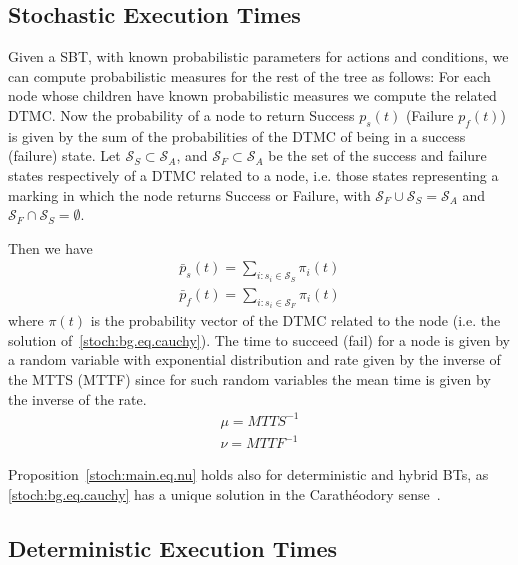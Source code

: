 
\subsection{Stochastic Execution Times}

\begin{proposition}
Given a SBT, with known probabilistic parameters for actions and conditions, we can compute probabilistic measures for the rest of the tree as follows:
For each node whose children have known probabilistic measures we compute the related DTMC. Now the probability of a node to return Success $p_s(t)$ (Failure $p_f(t)$) is given by the sum of the probabilities of the DTMC of being in a success (failure) state.
Let $\mathcal{S}_S\subset \mathcal{S}_A$, and $\mathcal{S}_F\subset \mathcal{S}_A$ be the set of the success and failure states respectively of a DTMC related to a node, i.e. those states representing a marking in which the node returns Success or Failure, with $\mathcal{S}_F \cup \mathcal{S}_S =\mathcal{S}_A$ and $\mathcal{S}_F \cap \mathcal{S}_S =\emptyset$. 

Then we have
\begin{eqnarray}
\bar p_s(t)=\displaystyle \sum_{i:s_i\in \mathcal{S}_S} \pi_i(t) \label{stoch:main.eq.ps} \\
\bar p_f(t)=\displaystyle \sum_{i:s_i\in \mathcal{S}_F} \pi_i(t)
\end{eqnarray}
where $\pi(t)$ is the probability vector of the DTMC related to the node (i.e. the solution of~\eqref{stoch:bg.eq.cauchy}). 
The time to succeed (fail) for a node is given by a random variable with exponential distribution 
and rate given by the inverse of the MTTS (MTTF) since for such random variables the mean time is given by the inverse of the rate.
\begin{eqnarray}
\mu=MTTS^{-1}\\
\nu=MTTF^{-1}
\label{stoch:main.eq.nu}
\end{eqnarray}
\end{proposition}
\begin{remark}
Proposition~\ref{stoch:main.eq.nu} holds also for deterministic and hybrid BTs, as \eqref{stoch:bg.eq.cauchy} has a unique solution in the Carath\'eodory sense~\cite{filippov1988differential}.

\end{remark}
\subsection{Deterministic Execution Times}
\label{stoch:PS.numdet}

